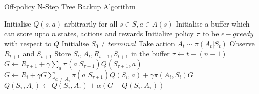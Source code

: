 \documentclass[../main.tex]{subfiles}
\begin{document}
\begin{algorithm}[H]
\caption{Off-policy N-Step Tree Backup Algorithm}
\label{alg:offpolicy_nstep_tree_backup}
\begin{algorithmic}[1]
\State Initialise $Q(s,a)$ arbitrarily for all $s \in S, a \in A(s)$
\State Initialise a buffer which can store upto $n$ states, actions and rewards
\State Initialize policy $\pi$ to be  $\epsilon-greedy$ with respect to $Q$
\State Initialise $S_0 \neq terminal $
\State Take action $A_t \sim \pi(A_t|S_t)$
\State Observe $R_{t+1}$ and $S_{t+1}$
\State Store $S_t, A_t, R_{t+1}, S_{t+1}$ in the buffer
\State $\tau \gets t - (n - 1)$
\State $G \gets R_{\tau +1} + \gamma \sum_a \pi(a|S_{\tau+1})Q(S_{\tau +1},a) $
\State $G \gets R_i + \gamma G  \sum_{a \neq A_i} \pi(a|S_{\tau+1})Q(S_i,a)  +  \gamma \pi(A_i, S_i)G$
\EndFor
\State $Q(S_\tau, A_\tau) \leftarrow Q(S_\tau, A_\tau) + \alpha (G - Q(S_\tau, A_\tau))$

\EndIf
\EndFor
\EndWhile
\end{algorithmic}
\end{algorithm}
\end{document}
